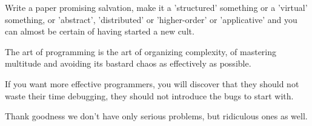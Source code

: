 \documentclass{scrartcl}
\begin{document}
\textbullet Write a paper promising salvation, make it a 'structured' something or a 'virtual' something, or 'abstract', 'distributed' or 'higher-order' or 'applicative' and you can almost be certain of having started a new cult.

\textbullet The art of programming is the art of organizing complexity, of mastering multitude and avoiding its bastard chaos as effectively as possible.

\textbullet If you want more effective programmers, you will discover that they should not waste their time debugging, they should not introduce the bugs to start with.

\textbullet Thank goodness we don't have only serious problems, but ridiculous ones as well.





\end{document}
